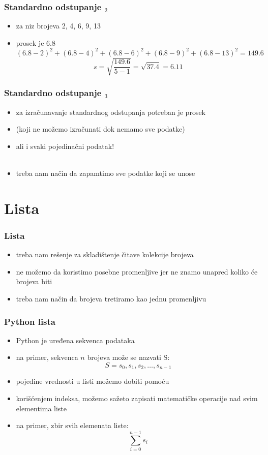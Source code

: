 \documentclass[utf8,compress]{beamer}
\begin{document}
\begin{frame}[fragile]
  \frametitle{Standardno odstupanje $_2$}
  \begin{itemize}
    \item za niz brojeva 2, 4, 6, 9, 13
    \item prosek je 6.8 \\
    $$(6.8-2)^2 + (6.8-4)^2 + (6.8-6)^2 + (6.8-9)^2 + (6.8-13)^2 = 149.6$$
    $$s = \sqrt{\frac{149.6}{5-1}} = \sqrt{37.4} = 6.11$$
  \end{itemize}
\end{frame}

\begin{frame}[fragile]
  \frametitle{Standardno odstupanje $_3$}
  \begin{itemize}
    \item za izračunavanje standardnog odstupanja potreban je prosek
    \item (koji ne možemo izračunati dok nemamo sve podatke)
    \item ali i svaki pojedinačni podatak! \\ \ \\
    \item treba nam način da zapamtimo sve podatke koji se unose
  \end{itemize}
\end{frame}

\section[Lista]{Lista}

\begin{frame}[fragile]
  \frametitle{Lista}
  \begin{itemize}
    \item treba nam rešenje za skladištenje čitave kolekcije brojeva
    \item ne možemo da koristimo posebne promenljive jer ne znamo unapred koliko će brojeva biti
    \item treba nam način da  brojeva tretiramo kao jednu promenljivu
  \end{itemize}
\end{frame}

\begin{frame}[fragile]
  \frametitle{Python lista}
  \begin{itemize}
    \item Python  je uređena sekvenca podataka
    \item na primer, sekvenca $n$ brojeva može se nazvati S: \\
    $$S = s_0, s_1, s_2, \ldots, s_{n-1}$$
    \item pojedine vrednosti u listi možemo dobiti pomoću 
    \item korišćenjem indeksa, možemo sažeto zapisati matematičke operacije nad svim elementima liste
    \item na primer, zbir svih elemenata liste: \\
    $$ \sum_{i=0}^{n-1}{s_i} $$
  \end{itemize}
\end{frame}
\end{document}

